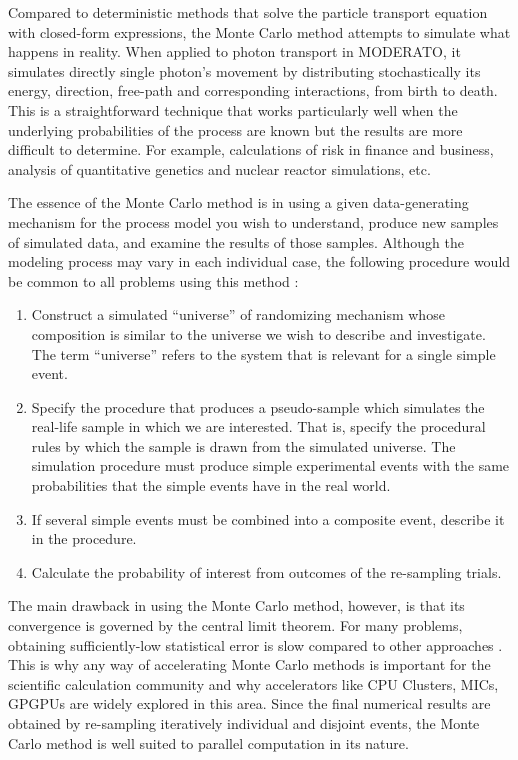 Compared to deterministic methods that solve the particle transport equation with closed-form expressions, the Monte Carlo method attempts to simulate what happens in reality. When applied to photon transport in MODERATO, it simulates directly single photon's movement by distributing stochastically its energy, direction, free-path and corresponding interactions, from birth to death. This is a straightforward technique that works particularly well when the underlying probabilities of the process are known but the results are more difficult to determine. For example, calculations of risk in finance and business, analysis of quantitative genetics and nuclear reactor simulations, etc.

The essence of the Monte Carlo method is in using a given data-generating mechanism for the process model you wish to understand, produce new samples of simulated data, and examine the results of those samples. Although the modeling process may vary in each individual case, the following procedure would be common to all problems using this method \citep{montecarlo}:
\begin{enumerate}
\it
\item Construct a simulated “universe” of randomizing mechanism whose composition is similar to the universe we wish to describe and investigate. The term “universe” refers to the system that is relevant for a single simple event.
\item Specify the procedure that produces a pseudo-sample which simulates the real-life sample in which we are interested. That is, specify the procedural rules by which the sample is drawn from the simulated universe. The simulation procedure must produce simple experimental events with the same probabilities that the simple events have in the real world.
\item If several simple events must be combined into a composite event, describe it in the procedure.
\item Calculate the probability of interest from outcomes of the re-sampling trials.
\end{enumerate}
The main drawback in using the Monte Carlo method, however, is that its convergence is governed by the central limit theorem. For many problems, obtaining sufficiently-low statistical error is slow compared to other approaches \citep{Reference2}. This is why any way of accelerating Monte Carlo methods is important for the scientific calculation community and why accelerators like CPU Clusters, MICs, GPGPUs are widely explored in this area. Since the final numerical results are obtained by re-sampling iteratively individual and disjoint events, the Monte Carlo method is well suited to parallel computation in its nature. 

